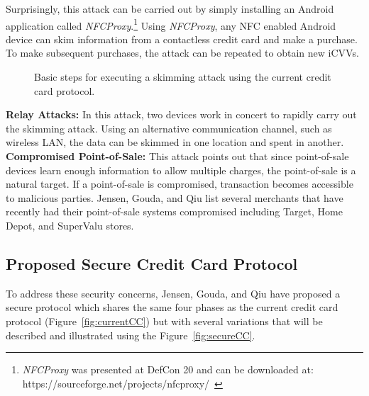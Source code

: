 \documentclass{sig-alternate}
\begin{document}
Surprisingly, this attack can be carried out by simply installing an Android application called \textit{NFCProxy}.\footnote{\textit{NFCProxy} was presented at DefCon 20 and can be downloaded at: https://sourceforge.net/projects/nfcproxy/~\cite{CC2016}}
Using \textit{NFCProxy}, any NFC enabled Android device can skim information from a contactless credit card and make a  purchase. To make subsequent purchases, the attack can be repeated to obtain new iCVVs.
\begin{figure}
\centering
{}
\caption{Basic steps for executing a skimming attack using the current credit card protocol.~\cite{CC2016}}
\label{fig:skim}
\end{figure}
\vspace{2mm}\newline
\noindent\textbf{Relay Attacks:}
In this attack, two devices work in concert to rapidly carry out the skimming attack. Using an alternative communication channel, such as wireless LAN, the data can be skimmed in one location and spent in another.
\vspace{2mm}\newline
\noindent\textbf{Compromised Point-of-Sale:}
This attack points out that since point-of-sale devices learn enough information to allow multiple charges, the point-of-sale is a natural target. If a point-of-sale is compromised, transaction becomes accessible to malicious parties. Jensen, Gouda, and Qiu list several merchants that have recently had their point-of-sale systems compromised including Target, Home Depot, and SuperValu stores.

\subsection{Proposed Secure Credit Card Protocol}
To address these security concerns, Jensen, Gouda, and Qiu have proposed a secure protocol which shares the same four phases as the current credit card protocol (Figure~\ref{fig:currentCC}) but with several variations that will be described and illustrated using the Figure~\ref{fig:secureCC}.
\end{document}
